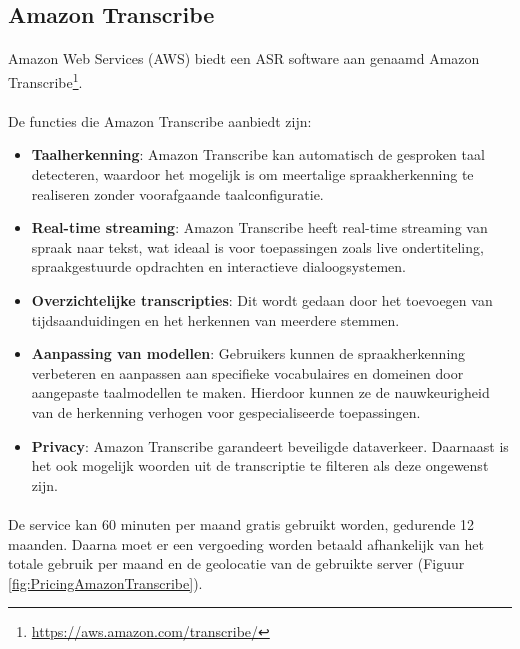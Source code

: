 \subsection{Amazon Transcribe}%

\paragraph{}
Amazon Web Services (AWS) biedt een ASR software aan genaamd Amazon Transcribe\footnote{\href{https://aws.amazon.com/transcribe/}{https://aws.amazon.com/transcribe/}}.

\paragraph{}
De functies die Amazon Transcribe aanbiedt zijn:

\begin{itemize}
    \item \textbf{Taalherkenning}: Amazon Transcribe kan automatisch de gesproken taal detecteren, waardoor het mogelijk is om meertalige spraakherkenning te realiseren zonder voorafgaande taalconfiguratie.

    \item \textbf{Real-time streaming}: Amazon Transcribe heeft real-time streaming van spraak naar tekst, wat ideaal is voor toepassingen zoals live ondertiteling, spraakgestuurde opdrachten en interactieve dialoogsystemen.

    \item \textbf{Overzichtelijke transcripties}: Dit wordt gedaan door het toevoegen van tijdsaanduidingen en het herkennen van meerdere stemmen.

    \item \textbf{Aanpassing van modellen}: Gebruikers kunnen de spraakherkenning verbeteren en aanpassen aan specifieke vocabulaires en domeinen door aangepaste taalmodellen te maken. Hierdoor kunnen ze de nauwkeurigheid van de herkenning verhogen voor gespecialiseerde toepassingen.

    \item \textbf{Privacy}: Amazon Transcribe garandeert beveiligde dataverkeer. Daarnaast is het ook mogelijk woorden uit de transcriptie te filteren als deze ongewenst zijn.
\end{itemize}

\paragraph{}
De service kan 60 minuten per maand gratis gebruikt worden, gedurende 12 maanden. Daarna moet er een vergoeding worden betaald afhankelijk van het totale gebruik per maand en de geolocatie van de gebruikte server (Figuur \ref{fig:PricingAmazonTranscribe}).


